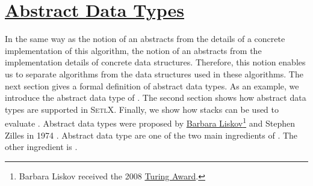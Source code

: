 \chapter{\href{https://en.wikipedia.org/wiki/Abstract_data_type}{Abstract Data Types}}
In the same way as the notion of an  abstracts from the details of a concrete
implementation of this algorithm, the notion of an  abstracts from the implementation
details of concrete data structures.  Therefore, this notion enables us to separate algorithms from the data
structures used in these algorithms.  The next section gives a formal definition of
abstract data types.  As an example, we introduce the abstract data type of .
The second section shows how abstract data types are supported in \textsc{SetlX}.  Finally, we show how stacks can be used
to evaluate .  Abstract data types were proposed by
\href{https://en.wikipedia.org/wiki/Barbara_Liskov}{Barbara Liskov}\footnote{
  Barbara Liskov received the 2008 \href{https://en.wikipedia.org/wiki/Turing_Award}{Turing Award}.}
and Stephen Zilles in 1974 \cite{liskov:1974}.  Abstract data type are one of the two main ingredients of
.  The other ingredient is .

